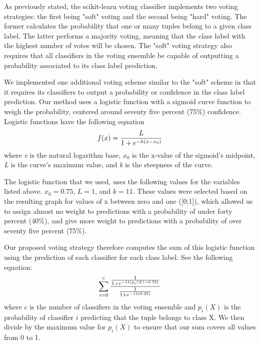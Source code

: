 As previously stated, the scikit-learn voting classifier implements two voting strategies: the first being "soft" voting and the second being "hard" voting. The former calculates the probability that one or many tuples belong to a given class label. The latter performs a majority voting, meaning that the class label with the highest number of votes will be chosen.
The "soft" voting strategy also requires that all classifiers in the voting ensemble be capable of outputting a probability associated to its class label prediction.

We implemented one additional voting scheme similar to the "soft" scheme in that it requires its classifiers to output a probability or confidence in the class label prediction. Our method uses a logistic function with a sigmoid curve function to weigh the probability, centered around seventy five percent (75\%) confidence.
Logistic functions have the following equation
\begin{equation}
    f(x)=\frac{L}{1+e^{-k(x-x_0)}}\\ 
    \label{eq:logistic_function}
\end{equation}
where \textit{e} is the natural logarithm base, \textit{$x_0$} is the x-value of the sigmoid's midpoint, \textit{L} is the curve's maximum value, and \textit{k} is the steepness of the curve.

The logistic function that we used, uses the following values for the variables listed above. $x_0=0.75$, $L=1$, and $k=11$. These values were selected based on the resulting graph for values of x between zero and one ([0;1]), which allowed us to assign almost no weight to predictions with a probability of under forty percent (40\%), and give more weight to predictions with a probability of over seventy five percent (75\%).

Our proposed voting strategy therefore computes the sum of this logistic function using the prediction of each classifier for each class label. See the following equation:
\begin{equation}
    \sum_{i=0}^{c} \frac{\frac{1}{1+e^{-11(p_i(X)-0.75)}}}{\frac{1}{1+e^{-11(0.25)}}}\\ 
    \label{eq:logistic_sum}
\end{equation}
where $c$ is the number of classifiers in the voting ensemble and $p_i(X)$ is the probability of classifier $i$ predicting that the tuple belongs to class X. We then divide by the maximum value for $p_i(X)$ to ensure that our sum covers all values from 0 to 1.

